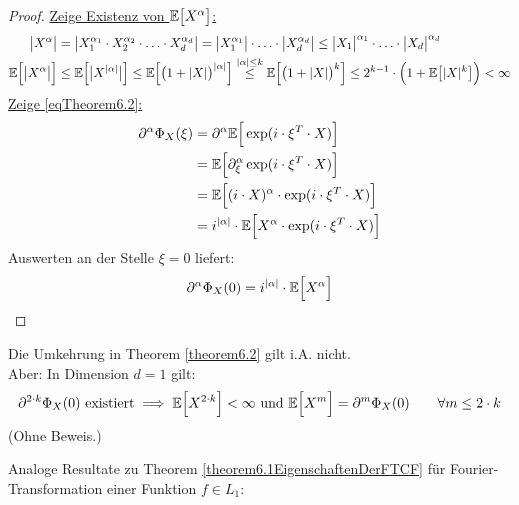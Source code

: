 \begin{proof}
\underline{Zeige Existenz von $\mathbb{E}\big[X^\alpha\big]$:}
\begin{align*}
\big|X^\alpha\big|
&=\big|X_1^{\alpha_1}\cdot X_2^{\alpha_2}\cdot\ldots\cdot X_d^{\alpha_d}\big|
=\big|X_1^{\alpha_1}\big|\cdot\ldots\cdot\big|X_d^{\alpha_d}\big|
\leq\big|X_1\big|^{\alpha_1}\cdot\ldots\cdot\big|X_d\big|^{\alpha_d}\\
\mathbb{E}\Big[\big|X^\alpha\big|\Big]
&\leq
\mathbb{E}\Big[\big|X^{|\alpha|}\big|\Big]
\leq
\mathbb{E}\Big[\big(1+|X|\big)^{|\alpha|}\Big]
\overset{|\alpha|\leq k}{\leq}
\mathbb{E}\Big[\big(1+|X|\big)^k\Big]
\leq 2^{k-1}\cdot\Big(1+\mathbb{E}\big[|X|^k\big]\Big)<\infty
\end{align*}
\underline{Zeige \eqref{eqTheorem6.2}:}
\begin{align*}
\partial^\alpha\Phi_X(\xi)
&=\partial^\alpha\mathbb{E}\Big[\exp(i\cdot\xi^T\cdot X)\Big]\\
&=\mathbb{E}\Big[\partial^\alpha_\xi\exp(i\cdot\xi^T\cdot X)\Big]\\
&=\mathbb{E}\Big[(i\cdot X)^\alpha\cdot\exp(i\cdot\xi^T\cdot X)\Big]\\
&=i^{|\alpha|}\cdot\mathbb{E}\Big[X^\alpha\cdot\exp(i\cdot\xi^T\cdot X)\Big]
\end{align*}
Auswerten an der Stelle $\xi=0$ liefert:
\begin{align*}
\partial^\alpha\Phi_X(0)=i^{|\alpha|}\cdot\mathbb{E}\Big[X^\alpha\Big]
\end{align*}
\end{proof}

\begin{bemerkung}
Die Umkehrung in Theorem \ref{theorem6.2} gilt i.A. nicht.\\
Aber: In Dimension $d=1$ gilt:
\begin{align*}
\partial^{2\cdot k}\Phi_X(0)\text{ existiert}\implies\mathbb{E}\Big[X^{2\cdot k}\Big]<\infty\text{ und }\mathbb{E}\Big[X^m\Big]=\partial^m\Phi_X(0)\qquad\forall m\leq 2\cdot k
\end{align*}
(Ohne Beweis.)
\end{bemerkung}

Analoge Resultate zu Theorem \ref{theorem6.1EigenschaftenDerFTCF} für Fourier-Transformation einer Funktion $f\in L_1$:

